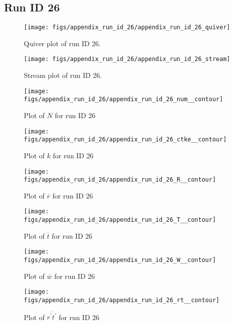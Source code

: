 \subsection{Run ID 26}
\begin{figure}[H]
\centering
\texttt{[image: figs/appendix\_run\_id\_26/appendix\_run\_id\_26\_quiver]}
\caption{Quiver plot of run ID 26.}
\label{fig:appendix_run_id_26_quiver}
\end{figure}


\begin{figure}[H]
\centering
\texttt{[image: figs/appendix\_run\_id\_26/appendix\_run\_id\_26\_stream]}
\caption{Stream plot of run ID 26.}
\label{fig:appendix_run_id_26_stream}
\end{figure}


\begin{figure}[H]
\centering
\texttt{[image: figs/appendix\_run\_id\_26/appendix\_run\_id\_26\_num\_\_contour]}
\caption{Plot of $N$ for run ID 26}
\label{fig:appendix_run_id_26_num__contour}
\end{figure}


\begin{figure}[H]
\centering
\texttt{[image: figs/appendix\_run\_id\_26/appendix\_run\_id\_26\_ctke\_\_contour]}
\caption{Plot of $k$ for run ID 26}
\label{fig:appendix_run_id_26_ctke__contour}
\end{figure}


\begin{figure}[H]
\centering
\texttt{[image: figs/appendix\_run\_id\_26/appendix\_run\_id\_26\_R\_\_contour]}
\caption{Plot of $\overline{r}$ for run ID 26}
\label{fig:appendix_run_id_26_R__contour}
\end{figure}


\begin{figure}[H]
\centering
\texttt{[image: figs/appendix\_run\_id\_26/appendix\_run\_id\_26\_T\_\_contour]}
\caption{Plot of $\overline{t}$ for run ID 26}
\label{fig:appendix_run_id_26_T__contour}
\end{figure}


\begin{figure}[H]
\centering
\texttt{[image: figs/appendix\_run\_id\_26/appendix\_run\_id\_26\_W\_\_contour]}
\caption{Plot of $\overline{w}$ for run ID 26}
\label{fig:appendix_run_id_26_W__contour}
\end{figure}


\begin{figure}[H]
\centering
\texttt{[image: figs/appendix\_run\_id\_26/appendix\_run\_id\_26\_rt\_\_contour]}
\caption{Plot of $\overline{r^\prime t^\prime}$ for run ID 26}
\label{fig:appendix_run_id_26_rt__contour}
\end{figure}


